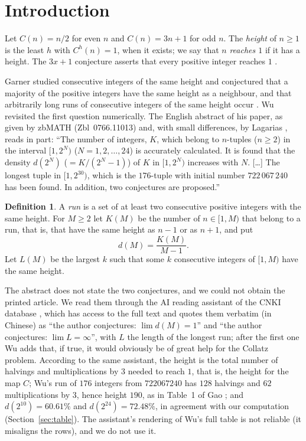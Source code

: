 \documentclass[11pt]{amsart}
\theoremstyle{definition}
\newtheorem{definition}[theorem]{Definition}
\theoremstyle{remark}
\begin{document}
\section{Introduction}

Let $C(n)=n/2$ for even $n$ and $C(n)=3n+1$ for odd $n$. The \emph{height} of $n\ge1$ is the least $h$ with $C^{h}(n)=1$, when it exists; we say that $n$ \emph{reaches $1$} if it has a height. The $3x+1$ conjecture asserts that every positive integer reaches $1$ \cite{Lag85,Lag10}.

Garner \cite{Gar85} studied consecutive integers of the same height and conjectured that a majority of the positive integers have the same height as a neighbour, and that arbitrarily long runs of consecutive integers of the same height occur \cite[entry~67]{Lag03}. Wu \cite{Wu92} revisited the first question numerically. The English abstract of his paper, as given by zbMATH (Zbl~0766.11013) and, with small differences, by Lagarias \cite[entry~170]{Lag03}, reads in part: ``The number of integers, $K$, which belong to $n$-tuples ($n\ge2$) in the interval $[1,2^N)$ ($N=1,2,\dots,24$) is accurately calculated. It is found that the density $d(2^N)$ ($=K/(2^N-1)$) of $K$ in $[1,2^N)$ increases with $N$. [\dots] The longest tuple in $[1,2^{30})$, which is the $176$-tuple with initial number $722\,067\,240$ has been found. In addition, two conjectures are proposed.''

\begin{definition}\label{def:wu}
A \emph{run} is a set of at least two consecutive positive integers with the same height. For $M\ge2$ let $K(M)$ be the number of $n\in[1,M)$ that belong to a run, that is, that have the same height as $n-1$ or as $n+1$, and put
\[
d(M)=\frac{K(M)}{M-1}.
\]
Let $L(M)$ be the largest $k$ such that some $k$ consecutive integers of $[1,M)$ have the same height.
\end{definition}

The abstract does not state the two conjectures, and we could not obtain the printed article. We read them through the AI reading assistant of the CNKI database \cite{CNKI}, which has access to the full text and quotes them verbatim (in Chinese) as ``the author conjectures: $\lim d(M)=1$'' and ``the author conjectures: $\lim L=\infty$'', with $L$ the length of the longest run; after the first one Wu adds that, if true, it would obviously be of great help for the Collatz problem. According to the same assistant, the height is the total number of halvings and multiplications by $3$ needed to reach $1$, that is, the height for the map $C$; Wu's run of $176$ integers from $722067240$ has $128$ halvings and $62$ multiplications by $3$, hence height $190$, as in Table~1 of Gao \cite{Gao93}; and $d(2^{10})=60.61\%$ and $d(2^{24})=72.48\%$, in agreement with our computation (Section~\ref{sec:table}). The assistant's rendering of Wu's full table is not reliable (it misaligns the rows), and we do not use it.
\end{document}
